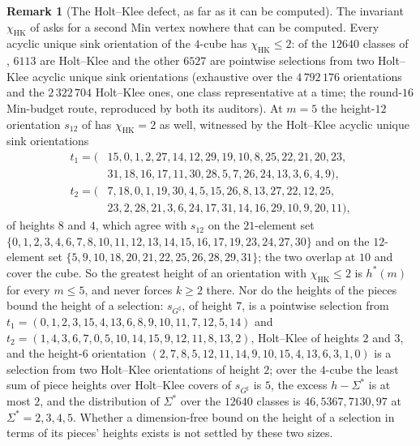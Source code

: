 \documentclass[11pt]{article}
\theoremstyle{plain}
\theoremstyle{definition}
\newtheorem{remark}[theorem]{Remark}
\begin{document}
\begin{remark}[The Holt--Klee defect, as far as it can be computed]\label{rem:hk-defect}
The invariant $\chi_{\mathrm{HK}}$ of  asks for a
second Min vertex nowhere that can be computed. Every acyclic unique sink
orientation of the $4$-cube has $\chi_{\mathrm{HK}}\le2$: of the $12640$
classes of , $6113$ are Holt--Klee and the other
$6527$ are pointwise selections from two Holt--Klee acyclic unique sink
orientations (exhaustive over the $4\,792\,176$ orientations and the
$2\,322\,704$ Holt--Klee ones, one class representative at a time; the
round-$16$ Min-budget route, reproduced by both its auditors). At $m=5$
the height-$12$ orientation $s_{12}$ of  has
$\chi_{\mathrm{HK}}=2$ as well, witnessed by the Holt--Klee acyclic unique
sink orientations
\[
\begin{aligned}
 t_1=(&15,0,1,2,27,14,12,29,19,10,8,25,22,21,20,23,\\
      &31,18,16,17,11,30,28,5,7,26,24,13,3,6,4,9),\\
 t_2=(&7,18,0,1,19,30,4,5,15,26,8,13,27,22,12,25,\\
      &23,2,28,21,3,6,24,17,31,14,16,29,10,9,20,11),
\end{aligned}
\]
of heights $8$ and $4$, which agree with $s_{12}$ on the $21$-element set
$\{0,1,2,3,4,6,7,8,10,11,12,13,14,15,16,17,19,23,24,27,30\}$ and on the
$12$-element set $\{5,9,10,18,20,21,22,25,26,28,29,31\}$; the two overlap
at $10$ and cover the cube. So the greatest height of an orientation with
$\chi_{\mathrm{HK}}\le2$ is $h^{\ast}(m)$ for every $m\le5$, and
 never forces $k\ge2$ there. Nor do the heights of
the pieces bound the height of a selection: $s_{G^{\sharp}}$, of height
$7$, is a pointwise selection from
$t_1=(0,1,2,3,15,4,13,6,8,9,10,11,7,12,5,14)$ and
$t_2=(1,4,3,6,7,0,5,10,14,15,9,12,11,8,13,2)$, Holt--Klee of heights $2$
and $3$, and the height-$6$ orientation
$(2,7,8,5,12,11,14,9,10,15,4,13,6,3,1,0)$ is a selection from two
Holt--Klee orientations of height $2$; over the $4$-cube the least sum of
piece heights over Holt--Klee covers of $s_{G^{\sharp}}$ is $5$, the excess
$h-\Sigma^{\ast}$ is at most $2$, and the distribution of $\Sigma^{\ast}$
over the $12640$ classes is $46,5367,7130,97$ at $\Sigma^{\ast}=2,3,4,5$.
Whether a dimension-free bound on the height of a selection in terms of
its pieces' heights exists is not settled by these two sizes.
\end{remark}
\end{document}

